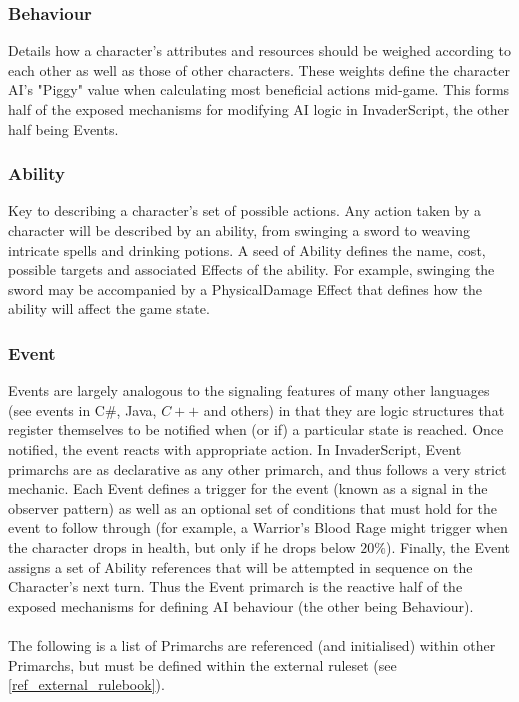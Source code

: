 \subsubsection{Behaviour}
Details how a character's attributes and resources should be weighed according to each other as well as those of other characters. These weights define the character AI's "Piggy" value when calculating most beneficial actions mid-game. This forms half of the exposed mechanisms for modifying AI logic in InvaderScript, the other half being Events. 

\subsubsection{Ability} 
Key to describing a character's set of possible actions. Any action taken by a character will be described by an ability, from swinging a sword to weaving intricate spells and drinking potions. A seed of Ability defines the name, cost, possible targets and associated Effects of the ability. For example, swinging the sword may be accompanied by a PhysicalDamage Effect that defines how the ability will affect the game state.

\subsubsection{Event}
Events are largely analogous to the signaling features of many other languages (see events in C\#, Java, $C++$ and others) in that they are logic structures that register themselves to be notified when (or if) a particular state is reached. Once notified, the event reacts with appropriate action. In InvaderScript, Event primarchs are as declarative as any other primarch, and thus follows a very strict mechanic. Each Event defines a trigger for the event (known as a signal in the observer pattern) as well as an optional set of conditions that must hold for the event to follow through (for example, a Warrior's Blood Rage might trigger when the character drops in health, but only if he drops below $20\%$). Finally, the Event assigns a set of Ability references that will be attempted in sequence on the Character's next turn. Thus the Event primarch is the reactive half of the exposed mechanisms for defining AI behaviour (the other being Behaviour).\\

\\ \noindent The following is a list of Primarchs are referenced (and initialised) within other Primarchs, but must be defined within the external ruleset (see \vref{ref_external_rulebook}).

